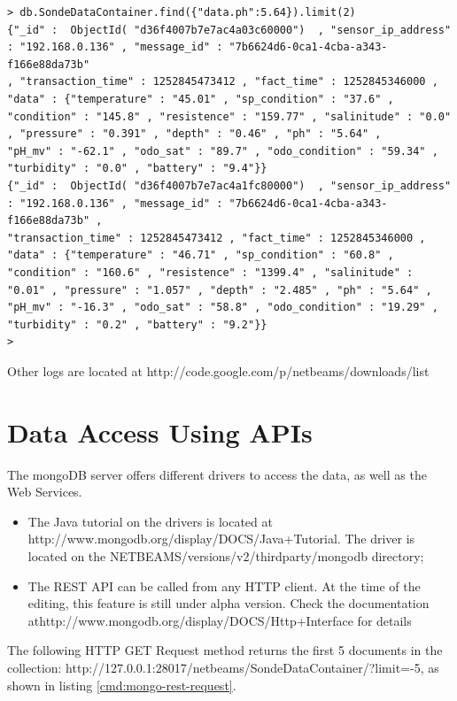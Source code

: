 \lstset{label=cmd:mongo-find-limit,caption=Query Element with specific
projection limiting the result set size}
\begin{lstlisting}
> db.SondeDataContainer.find({"data.ph":5.64}).limit(2)
{"_id" :  ObjectId( "d36f4007b7e7ac4a03c60000")  , "sensor_ip_address" : "192.168.0.136" , "message_id" : "7b6624d6-0ca1-4cba-a343-f166e88da73b"
, "transaction_time" : 1252845473412 , "fact_time" : 1252845346000 , "data" : {"temperature" : "45.01" , "sp_condition" : "37.6" ,
"condition" : "145.8" , "resistence" : "159.77" , "salinitude" : "0.0" , "pressure" : "0.391" , "depth" : "0.46" , "ph" : "5.64" ,
"pH_mv" : "-62.1" , "odo_sat" : "89.7" , "odo_condition" : "59.34" , "turbidity" : "0.0" , "battery" : "9.4"}}
{"_id" :  ObjectId( "d36f4007b7e7ac4a1fc80000")  , "sensor_ip_address" : "192.168.0.136" , "message_id" : "7b6624d6-0ca1-4cba-a343-f166e88da73b" ,
"transaction_time" : 1252845473412 , "fact_time" : 1252845346000 , "data" : {"temperature" : "46.71" , "sp_condition" : "60.8" ,
"condition" : "160.6" , "resistence" : "1399.4" , "salinitude" : "0.01" , "pressure" : "1.057" , "depth" : "2.485" , "ph" : "5.64" ,
"pH_mv" : "-16.3" , "odo_sat" : "58.8" , "odo_condition" : "19.29" , "turbidity" : "0.2" , "battery" : "9.2"}}
>
\end{lstlisting}

Other logs are located at
http://code.google.com/p/netbeams/downloads/list

\section{Data Access Using APIs}

The mongoDB server offers different drivers to access the data, as well as the
Web Services.

\begin{itemize}
  \item The Java tutorial on the drivers is located at
    http://www.mongodb.org/display/DOCS/Java+Tutorial. The driver is located on
    the NETBEAMS/versions/v2/thirdparty/mongodb directory;  
  \item The REST API can be called from any HTTP client. At the time of the
  editing, this feature is still under alpha version. Check the documentation
  athttp://www.mongodb.org/display/DOCS/Http+Interface for details 
\end{itemize}

The following HTTP GET Request method returns the first 5 documents in the collection:
http://127.0.0.1:28017/netbeams/SondeDataContainer/?limit=-5, as shown in
listing \ref{cmd:mongo-rest-request}.

